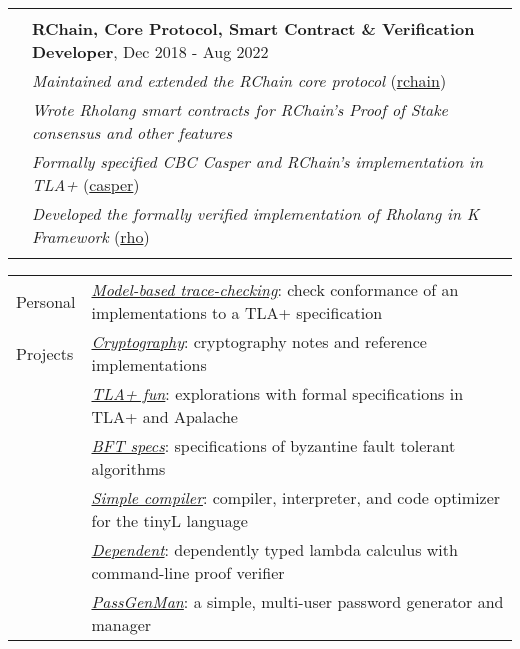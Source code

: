 \documentclass[letterpaper,10pt,oneside]{article}
\begin{document}
\begin{tabular}{@{} l l}
 & \\
 & \textbf{RChain, Core Protocol, Smart Contract \& Verification Developer}, Dec 2018 - Aug 2022 \\
 & \emph{Maintained and extended the RChain core protocol} (\href{https://github.com/rchain/rchain}{rchain}) \\
 & \emph{Wrote Rholang smart contracts for RChain's Proof of Stake consensus and other features} \\
 & \emph{Formally specified CBC Casper and RChain's implementation in TLA+} (\href{https://github.com/Isaac-DeFrain/TLAplus/tree/master/Casper}{casper}) \\
 & \emph{Developed the formally verified implementation of Rholang in K Framework} (\href{https://github.com/Isaac-DeFrain/KFramework/tree/master/Languages/GroundedRho}{rho}) \\
 & \\
\end{tabular}

\vfill


\noindent \begin{tabular}{@{} l l}
 \Large{Personal} & \href{https://github.com/Isaac-DeFrain/model-based-trace-checking}{\emph{Model-based trace-checking}}: check conformance of an implementations to a TLA+ specification \\
 \Large{Projects} & \href{https://github.com/Isaac-DeFrain/cryptography}{\emph{Cryptography}}: cryptography notes and reference implementations \\
 \hspace{1.1in}  & \href{https://github.com/Isaac-DeFrain/TLAplusFun}{\emph{TLA+ fun}}: explorations with formal specifications in TLA+ and Apalache \\
 & \href{https://github.com/Isaac-DeFrain/bft_specs}{\emph{BFT specs}}: specifications of byzantine fault tolerant algorithms \\
 & \href{https://github.com/Isaac-DeFrain/simple-compiler}{\emph{Simple compiler}}: compiler, interpreter, and code optimizer for the tinyL language \\
 & \href{https://github.com/Isaac-DeFrain/dependent}{\emph{Dependent}}: dependently typed lambda calculus with command-line proof verifier \\
 & \href{https://github.com/Isaac-DeFrain/PassGenMan}{\emph{PassGenMan}}: a simple, multi-user password generator and manager \\
\end{tabular}
\end{document}
